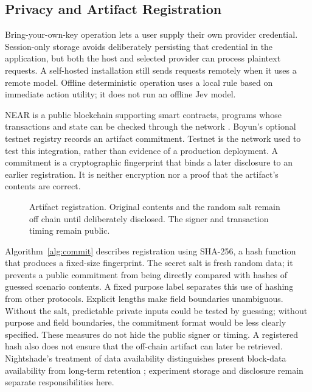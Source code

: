 \subsection{Privacy and Artifact Registration}\label{sec:near}
Bring-your-own-key operation lets a user supply their own provider credential.
Session-only storage avoids deliberately persisting that credential in the
application, but both the host and selected provider can process plaintext
requests. A self-hosted installation still sends requests remotely when it
uses a remote model. Offline deterministic operation uses a local rule based
on immediate action utility; it does not run an offline Jev model.

NEAR is a public blockchain supporting smart contracts, programs whose
transactions and state can be checked through the network
\cite{nearprotocol,nightshade2024}.
Boyun's optional testnet registry records an artifact commitment. Testnet is
the network used to test this integration, rather than evidence of a production
deployment. A commitment is a cryptographic fingerprint that binds a later
disclosure to an earlier registration. It is neither encryption nor a proof
that the artifact's contents are correct.

\begin{figure}[t]
\centering
{}
\caption{Artifact registration. Original contents and the random salt remain
off chain until deliberately disclosed. The signer and transaction timing
remain public.}
\label{fig:integrity}
\end{figure}

Algorithm~\ref{alg:commit} describes registration using SHA-256, a hash function
that produces a fixed-size fingerprint. The secret salt is fresh random data;
it prevents a public commitment from being directly compared with hashes of
guessed scenario contents. A fixed purpose label separates this use of hashing
from other protocols. Explicit lengths make field boundaries unambiguous.
Without the salt, predictable private inputs could be tested by guessing;
without purpose and field boundaries, the commitment format would be less
clearly specified. These measures do not hide the public signer or timing.
A registered hash also does not ensure that the off-chain artifact can later
be retrieved. Nightshade's treatment of data availability distinguishes
present block-data availability from long-term retention \cite{nightshade2024};
experiment storage and disclosure remain separate responsibilities here.

